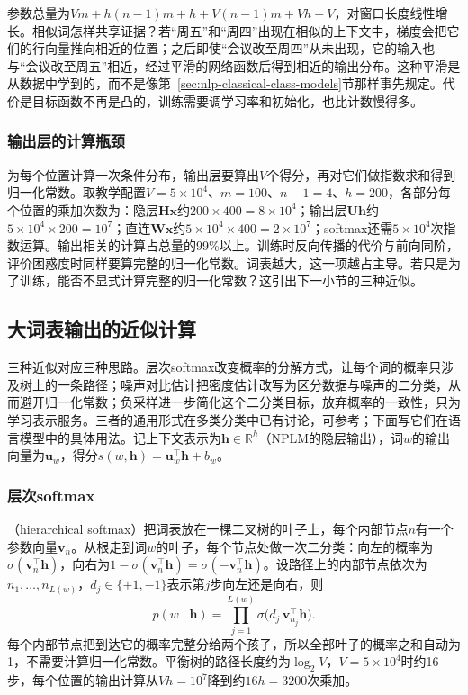 参数总量为$Vm+h(n-1)m+h+V(n-1)m+Vh+V$，对窗口长度线性增长。相似词怎样共享证据？若“周五”和“周四”出现在相似的上下文中，梯度会把它们的行向量推向相近的位置；之后即使“会议改至周四”从未出现，它的输入也与“会议改至周五”相近，经过平滑的网络函数后得到相近的输出分布。这种平滑是从数据中学到的，而不是像第~\ref{sec:nlp-classical-class-models}节那样事先规定。代价是目标函数不再是凸的，训练需要调学习率和初始化，也比计数慢得多。

\subsubsection{输出层的计算瓶颈}
\label{sec:nlp-classical-output-bottleneck}

为每个位置计算一次条件分布，输出层要算出$V$个得分，再对它们做指数求和得到归一化常数。取教学配置$V=5\times10^4$、$m=100$、$n-1=4$、$h=200$，各部分每个位置的乘加次数为：隐层$\bm H\bm x$约$200\times400=8\times10^4$；输出层$\bm U\bm h$约$5\times10^4\times200=10^7$；直连$\bm W\bm x$约$5\times10^4\times400=2\times10^7$；softmax还需$5\times10^4$次指数运算。输出相关的计算占总量的99\%以上。训练时反向传播的代价与前向同阶，评价困惑度时同样要算完整的归一化常数。词表越大，这一项越占主导。若只是为了训练，能否不显式计算完整的归一化常数？这引出下一小节的三种近似。

\subsection{大词表输出的近似计算}
\label{sec:nlp-classical-large-vocab}

三种近似对应三种思路。层次softmax改变概率的分解方式，让每个词的概率只涉及树上的一条路径；噪声对比估计把密度估计改写为区分数据与噪声的二分类，从而避开归一化常数；负采样进一步简化这个二分类目标，放弃概率的一致性，只为学习表示服务。三者的通用形式在多类分类中已有讨论，可参考；下面写它们在语言模型中的具体用法。记上下文表示为$\bm h\in\mathbb R^{h}$（NPLM的隐层输出），词$w$的输出向量为$\bm u_w$，得分$s(w,\bm h)=\bm u_w^{\top}\bm h+b_w$。

\subsubsection{层次softmax}
\label{sec:nlp-classical-hierarchical-softmax}

（hierarchical softmax）把词表放在一棵二叉树的叶子上，每个内部节点$n$有一个参数向量$\bm v_n$。从根走到词$w$的叶子，每个节点处做一次二分类：向左的概率为$\sigma(\bm v_n^{\top}\bm h)$，向右为$1-\sigma(\bm v_n^{\top}\bm h)=\sigma(-\bm v_n^{\top}\bm h)$。设路径上的内部节点依次为$n_1,\ldots,n_{L(w)}$，$d_j\in\{+1,-1\}$表示第$j$步向左还是向右，则
\begin{equation}
  p(w\mid\bm h)=\prod_{j=1}^{L(w)}\sigma\bigl(d_j\,\bm v_{n_j}^{\top}\bm h\bigr).
  \label{eq:nlp-classical-hsoftmax}
\end{equation}
每个内部节点把到达它的概率完整分给两个孩子，所以全部叶子的概率之和自动为1，不需要计算归一化常数。平衡树的路径长度约为$\log_2V$，$V=5\times10^4$时约16步，每个位置的输出计算从$Vh=10^7$降到约$16h=3200$次乘加。

